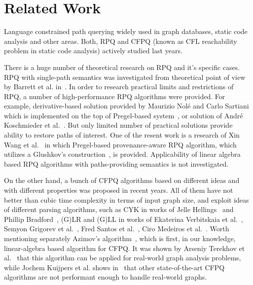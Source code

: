 \section{Related Work}

Language constrained path querying widely used in graph databases, static code analysis and other areas.
Both, RPQ and CFPQ (known as CFL reachability problem in static code analysis) actively studied last years.

There is a huge number of theoretical research on RPQ and it's specific cases.
RPQ with single-path semantics was investigated from theoretical point of view by Barrett et al. in~\cite{barrett2000formal}.
In order to research practical limits and restrictions of RPQ, a number of high-performance RPQ algorithms were provided.
For example, derivative-based solution provided by Maurizio Nol\'{e} and Carlo Sartiani which is implemented on the top of Pregel-based system~\cite{10.1145/2949689.2949711}, or solution of Andr\'{e} Koschmieder et al.~\cite{10.1007/978-3-642-31235-9_12}.
But only limited number of practical solutions provide ability to restore paths of interest. 
One of the resent work is a research of Xin Wang et al.~\cite{Wang2019} in which Pregel-based provenance-aware RPQ algorithm, which utilizes a Glushkov's construction~\cite{Glushkov1961}, is provided.
Applicability of linear algebra based RPQ algorithms with paths-providing semantics is not investigated.

On the other hand, a bunch of CFPQ algorithms based on different ideas and with different properties was proposed in recent years. 
All of them have not better than cubic time complexity in terms of input graph size, and exploit ideas of different parsing algorithms, such as CYK in works of Jelle Hellings~\cite{hellingsRelational} and Phillip Bradford~\cite{8249039}, (G)LR and (G)LL in works of Ekaterina Verbitskaia et al.~\cite{10.1007/978-3-319-41579-6_22}, Semyon Grigorev et al.~\cite{Grigorev:2017:CPQ:3166094.3166104}, Fred Santos et al.~\cite{10.1007/978-3-319-91662-0_17}, Ciro Medeiros et al.~\cite{Medeiros:2018:EEC:3167132.3167265}.
Worth mentioning separately Azimov's algorithm~\cite{Azimov:2018:CPQ:3210259.3210264}, which is first, in our knowledge, linear-algebra based algorithm for CFPQ. 
It was shown by Arseniy Terekhov et al.~\cite{10.1145/3398682.3399163} that this algorithm can be applied for real-world graph analysis problems, while Jochem Kuijpers et al. shows in~\cite{Kuijpers:2019:ESC:3335783.3335791} that other state-of-the-art CFPQ algorithms are not performant enough to handle real-world graphs.

